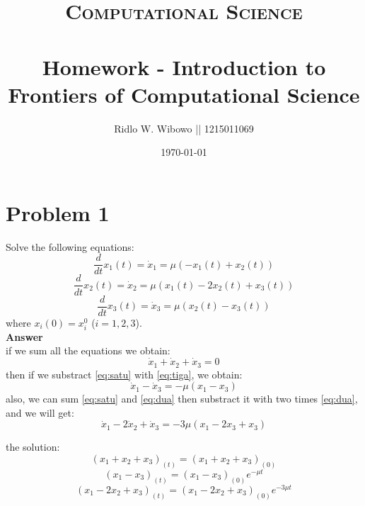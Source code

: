 \documentclass[paper=a4, fontsize=11pt]{scrartcl}
\title{	
\normalfont \normalsize 
\textsc{Computational Science} \\ [25pt] %
\horrule{0.5pt} \\[0.2cm] %
\small Homework - Introduction to Frontiers of Computational Science\\ %
}
\author{\small{Ridlo W. Wibowo || 1215011069}} %
\date{\small\today} %
\numberwithin{equation}{section} %
\numberwithin{figure}{section} %
\numberwithin{table}{section} %
\begin{document}
\maketitle %

\section{Problem 1}
Solve the following equations:
\begin{equation}
\label{eq:satu}
\frac{d}{dt} x_1(t) = \dot{x}_1 =  \mu(-x_1(t) +   x_2(t)         )
\end{equation}
\begin{equation}
\label{eq:dua}
\frac{d}{dt} x_2(t) = \dot{x}_2 =  \mu( x_1(t) - 2x_2(t) + x_3(t))
\end{equation}
\begin{equation}
\label{eq:tiga}
\frac{d}{dt} x_3(t) = \dot{x}_3 =  \mu(            x_2(t) - x_3(t))
\end{equation}
where $x_i(0) = x^0_i$ ($i=1,2,3$).\\


\textbf{Answer}\\
if we sum all the equations we obtain:
\begin{equation}
\label{eq:jwb1}
\dot{x}_1 + \dot{x}_2 + \dot{x}_3 = 0
\end{equation}
then if we substract \eqref{eq:satu} with \eqref{eq:tiga}, we obtain:
\begin{equation}
\label{eq:jwb2}
\dot{x}_1 - \dot{x}_3 = -\mu(x_1 - x_3)
\end{equation}
also, we can sum \eqref{eq:satu} and \eqref{eq:dua} then substract it with two times \eqref{eq:dua}, and we will get:
\begin{equation}
\label{eq:jwb2}
\dot{x}_1 - 2\dot{x}_2 + \dot{x}_3 = -3 \mu(x_1 - 2x_3 + x_3)
\end{equation}

the solution:
\begin{equation}
\label{eq:sol1}
(x_1 + x_2 + x_3)_{(t)} = (x_1 + x_2 + x_3)_{(0)}
\end{equation}
\begin{equation}
\label{eq:sol2}
(x_1 - x_3)_{(t)} = (x_1 - x_3)_{(0)} e^{-\mu t}
\end{equation}
\begin{equation}
\label{eq:sol3}
(x_1 - 2x_2 + x_3)_{(t)} = (x_1 - 2x_2 + x_3)_{(0)} e^{-3 \mu t}
\end{equation}
\end{document}
